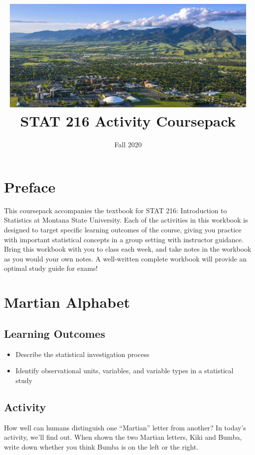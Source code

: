 \documentclass[
]{report}
\title{\includegraphics[width=5in,height=\textheight]{images/msu-campus.jpg}
\vspace{1cm}\\
STAT 216 Activity Coursepack}
\subtitle{Fall 2020}
\author{}
\date{\vspace{-2.5em}}
\begin{document}
\maketitle

{
\setcounter{tocdepth}{0}
\tableofcontents
}
\hypertarget{preface}{%
\chapter*{Preface}\label{preface}}

This coursepack accompanies the textbook for STAT 216: Introduction to Statistics at Montana State University. Each of the activities in this workbook is designed to target specific learning outcomes of the course, giving you practice with important statistical concepts in a group setting with instructor guidance. Bring this workbook with you to class each week, and take notes in the workbook as you would your own notes. A well-written complete workbook will provide an optimal study guide for exams!

\hypertarget{martian-alphabet}{%
\chapter{Martian Alphabet}\label{martian-alphabet}}

\hypertarget{learning-outcomes}{%
\section{Learning Outcomes}\label{learning-outcomes}}

\begin{itemize}
\item
  Describe the statistical investigation process
\item
  Identify observational units, variables, and variable types in a statistical study
\end{itemize}

\hypertarget{activity}{%
\section{Activity}\label{activity}}

How well can humans distinguish one ``Martian'' letter from another? In today's activity, we'll find out. When shown the two Martian letters, Kiki and Bumba, write down whether you think Bumba is on the left or the right.

\vspace{0.5in}
\end{document}
